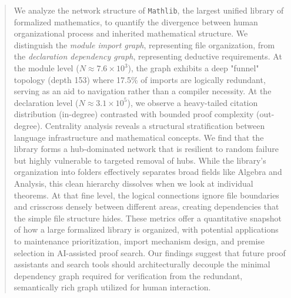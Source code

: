 \documentclass[11pt]{article}
\begin{document}
\begin{abstract}
We analyze the network structure of \texttt{Mathlib}, the largest unified library of formalized mathematics, to quantify the divergence between human organizational process and inherited mathematical structure. We distinguish the \emph{module import graph}, representing file organization, from the \emph{declaration dependency graph}, representing deductive requirements. At the module level ($N \approx 7.6 \times 10^3$), the graph exhibits a deep "funnel" topology (depth 153) where 17.5\% of imports are logically redundant, serving as an aid to navigation rather than a compiler necessity. At the declaration level ($N \approx 3.1 \times 10^5$), we observe a heavy-tailed citation distribution (in-degree) contrasted with bounded proof complexity (out-degree). Centrality analysis reveals a structural stratification between language infrastructure and mathematical concepts. We find that the library forms a hub-dominated network that is resilient to random failure but highly vulnerable to targeted removal of hubs. While the library's organization into folders effectively separates broad fields like Algebra and Analysis, this clean hierarchy dissolves when we look at individual theorems. At that fine level, the logical connections ignore file boundaries and crisscross densely between different areas, creating dependencies that the simple file structure hides. These metrics offer a quantitative snapshot of how a large formalized library is organized, with potential applications to maintenance prioritization, import mechanism design, and premise selection in AI-assisted proof search. Our findings suggest that future proof assistants and search tools should architecturally decouple the minimal dependency graph required for verification from the redundant, semantically rich graph utilized for human interaction.
\end{abstract}

\setcounter{tocdepth}{2}
\newpage
\tableofcontents
\newpage










\newpage



\newpage
\appendix

\end{document}
